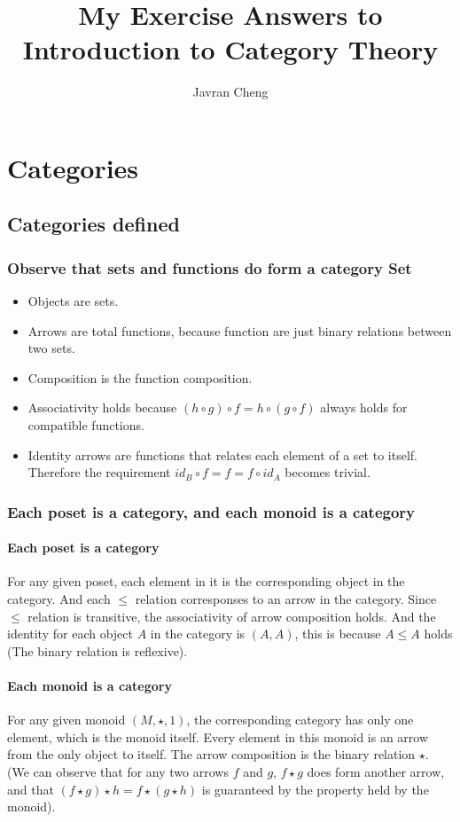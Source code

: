 \documentclass[11pt]{article}
\title{My Exercise Answers to \\
Introduction to Category Theory}
\author{Javran Cheng}
\begin{document}
\maketitle

\newcommand{\cat}[1]{\textbf{#1}}
\newcommand{\fcomp}{\circ}

\section{Categories}

\subsection{Categories defined}

\subsubsection{Observe that sets and functions do form a category \cat{Set}}

\begin{itemize}
  \item Objects are sets.
  \item Arrows are total functions, because function are just binary relations
    between two sets.
  \item Composition is the function composition.
  \item Associativity holds because $(h \fcomp g) \fcomp f = h \fcomp (g \fcomp f)$
    always holds for compatible functions.
  \item Identity arrows are functions that relates each element of a set to itself.
    Therefore the requirement $id_B \fcomp f = f = f \fcomp id_A$ becomes trivial.
\end{itemize}

\subsubsection{Each poset is a category, and each monoid is a category}

\paragraph{Each poset is a category} For any given poset, each element in it
is the corresponding object in the category. And each $\le$ relation corresponses
to an arrow in the category. Since $\le$ relation is transitive, the associativity
of arrow composition holds. And the identity for each object $A$ in the category is $(A,A)$,
this is because $A \le A$ holds (The binary relation is reflexive).

\paragraph{Each monoid is a category} For any given monoid $(M, \star , 1)$, the corresponding
category has only one element, which is the monoid itself. Every element in
this monoid is an arrow from the only object to itself. The arrow composition is
the binary relation $\star$. (We can observe that for any two arrows $f$ and $g$, $f \star g$
does form another arrow, and that $(f \star g) \star h = f \star (g \star h)$
is guaranteed by the property held by the monoid).
\end{document}
